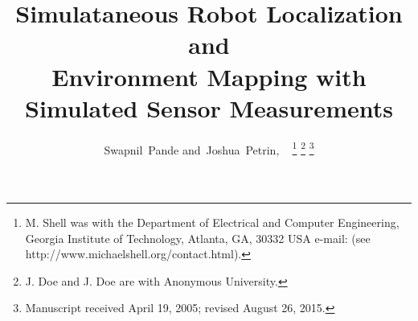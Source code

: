 \documentclass[journal]{IEEEtran}
\begin{document}
%
\title{Simulataneous Robot Localization and \\Environment Mapping with \\Simulated Sensor Measurements}
%
%
%

\author{Swapnil~Pande
        and~Joshua~Petrin,
        ~%
\thanks{M. Shell was with the Department
of Electrical and Computer Engineering, Georgia Institute of Technology, Atlanta,
GA, 30332 USA e-mail: (see http://www.michaelshell.org/contact.html).}%
\thanks{J. Doe and J. Doe are with Anonymous University.}%
\thanks{Manuscript received April 19, 2005; revised August 26, 2015.}}

% 
%
\end{document}
